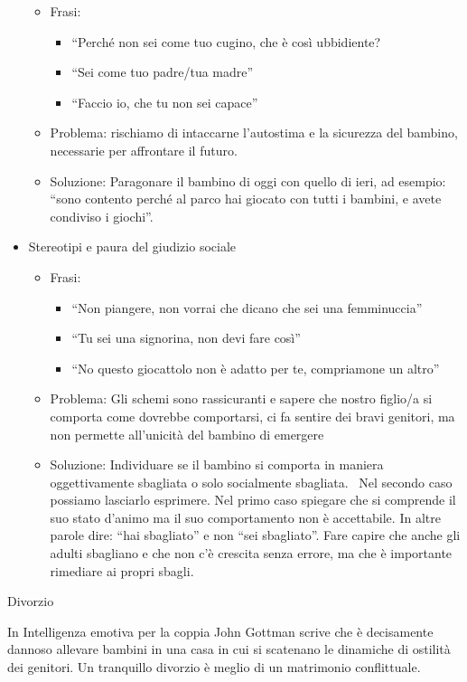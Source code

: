 \documentclass[12pt]{book} %
\begin{document}
\begin{itemize}
\begin{itemize}
\item Frasi:

\begin{itemize}
\item “Perché non sei come tuo cugino, che è così ubbidiente?{\textquotedbl}
\item “Sei come tuo padre/tua madre”
\item “Faccio io, che tu non sei capace”
\end{itemize}
\item Problema: rischiamo di intaccarne l'autostima e la sicurezza del bambino, necessarie per
affrontare il futuro. 
\item Soluzione: Paragonare il bambino di oggi con quello di ieri, ad esempio: “sono contento perché al parco hai
giocato con tutti i bambini, e avete condiviso i giochi”.
\end{itemize}
\item Stereotipi e paura del giudizio sociale

\begin{itemize}
\item Frasi:

\begin{itemize}
\item “Non piangere, non vorrai che dicano che sei una femminuccia”
\item “Tu sei una signorina, non devi fare così”
\item “No questo giocattolo non è adatto per te, compriamone un altro” 
\end{itemize}
\item Problema: Gli schemi sono rassicuranti e sapere che nostro figlio/a si comporta come dovrebbe comportarsi, ci fa
sentire dei bravi genitori, ma non permette all'unicità del bambino di emergere
\item Soluzione: Individuare se il bambino si comporta in maniera oggettivamente sbagliata o solo socialmente sbagliata.
\ Nel secondo caso possiamo lasciarlo esprimere. Nel primo caso spiegare che si comprende il suo stato
d'animo ma il suo comportamento non è accettabile. In altre parole dire: “hai sbagliato” e non
“sei sbagliato”. Fare capire che anche gli adulti sbagliano e che non c'è crescita senza errore, ma che è importante
rimediare ai propri sbagli.
\end{itemize}
\end{itemize}
Divorzio

In Intelligenza emotiva per la coppia John Gottman scrive che è
decisamente dannoso allevare bambini in una casa in cui si scatenano le dinamiche di ostilità dei genitori. Un
tranquillo divorzio è meglio di un matrimonio conflittuale. 
\end{document}
